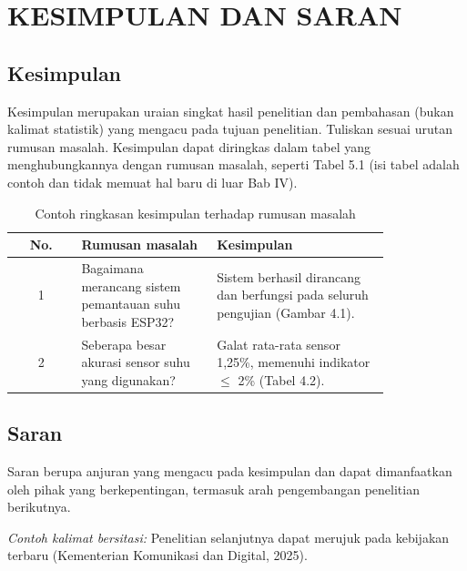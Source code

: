 \chapter{KESIMPULAN DAN SARAN}

\section{Kesimpulan}
Kesimpulan merupakan uraian singkat hasil penelitian dan pembahasan (bukan kalimat statistik) yang mengacu pada tujuan penelitian. Tuliskan sesuai urutan rumusan masalah. Kesimpulan dapat diringkas dalam tabel yang menghubungkannya dengan rumusan masalah, seperti Tabel 5.1 (isi tabel adalah contoh dan tidak memuat hal baru di luar Bab IV).

\begin{singlespace}
\begin{longtable}{|c|p{0.36\linewidth}|p{0.46\linewidth}|}
\caption{Contoh ringkasan kesimpulan terhadap rumusan masalah}\\
\hline
\textbf{No.} & \textbf{Rumusan masalah} & \textbf{Kesimpulan} \\
\hline
1 & Bagaimana merancang sistem pemantauan suhu berbasis ESP32? & Sistem berhasil dirancang dan berfungsi pada seluruh pengujian (Gambar 4.1). \\
\hline
2 & Seberapa besar akurasi sensor suhu yang digunakan? & Galat rata-rata sensor 1,25\%, memenuhi indikator $\leq$ 2\% (Tabel 4.2). \\
\hline
\end{longtable}
\end{singlespace}

\section{Saran}
Saran berupa anjuran yang mengacu pada kesimpulan dan dapat dimanfaatkan oleh pihak yang berkepentingan, termasuk arah pengembangan penelitian berikutnya.

\textit{Contoh kalimat bersitasi:} Penelitian selanjutnya dapat merujuk pada kebijakan terbaru (Kementerian Komunikasi dan Digital, 2025).
